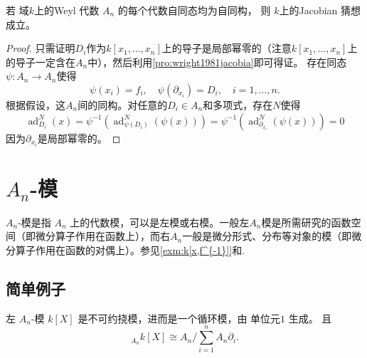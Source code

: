 \documentclass[12pt,a4paper]{ctexrep}   %
\begin{document}
\begin{theorem}
    若 域$k$上的Weyl 代数 $A_n$ 的每个代数自同态均为自同构，
    则 $k$上的Jacobian 猜想成立。
    \begin{proof}
        只需证明$D_i$作为$k[x_1,\dots,x_n]$上的导子是局部幂零的（注意$k[x_1,\dots,x_n]$上的导子一定含在$A_n$中），然后利用\ref{pro:wright1981jacobia}即可得证。
        存在同态$\psi : A_n \to A_n$使得
        \begin{equation*}
            \psi(x_i)=f_i, \quad \psi(\partial_{x_i})=D_i, \quad i=1,\dots,n.
        \end{equation*}
        根据假设，这$A_n$间的同构。对任意的$D_i\in A_n$和多项式，存在$N$使得
        \begin{equation*}
            \operatorname{ad}_{D_i}^N(x)
            =
            \psi^{-1}\left(\operatorname{ad}_{\psi(D_i)}^N(\psi(x))\right)
            =
            \psi^{-1}\left(\operatorname{ad}_{\partial_{x_i}}^N(\psi(x))\right)
            =
            0
        \end{equation*}
        因为$\partial_{x_i}$是局部幂零的。
    \end{proof}
\end{theorem}



\chapter{$A_n$-模}
$A_n$-模是指 $A_n$ 上的代数模，可以是左模或右模。一般左$A_n$模是所需研究的函数空间（即微分算子作用在函数上），而右$A_n$一般是微分形式、分布等对象的模（即微分算子作用在函数的对偶上）。参见\ref{exm:k[x,f^{-1}]}和\cite{bernshtein1972analytic}.
\section{简单例子}
\begin{example}
    \label{exm:k[x]}
    左 $A_n$-模 $k[X]$ 是不可约挠模，进而是一个循环模，由 单位元$1$ 生成。
    且
    \[
        {}_{A_n}k[X]\cong
        A_n/\sum_{i=1}^n A_n\partial_i.
    \]
\end{example}
\end{document}
